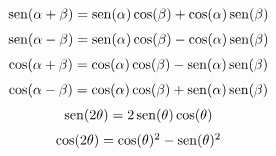 \begin{multicols}{2}
\begin{tcolorbox}[hbox, title=Razones trigonométicas de sumas de ángulos]
\begin{minipage}{0.4\textwidth}
\[
\renewcommand{\arraystretch}{1.5}
\begin{array}{c}
\sen(\alpha+\beta)=\sen(\alpha)\cos(\beta)+\cos(\alpha)\sen(\beta) \\
\sen(\alpha-\beta)=\sen(\alpha)\cos(\beta)-\cos(\alpha)\sen(\beta) \\
\cos(\alpha+\beta)=\cos(\alpha)\cos(\beta)-\sen(\alpha)\sen(\beta) \\
\cos(\alpha-\beta)=\cos(\alpha)\cos(\beta)+\sen(\alpha)\sen(\beta) \\
\sen(2\theta)=2\sen(\theta)\cos(\theta)                            \\
\cos(2\theta)=\cos(\theta)^2-\sen(\theta)^2
\end{array}
\]
\end{minipage}
\end{tcolorbox}


\end{multicols}
